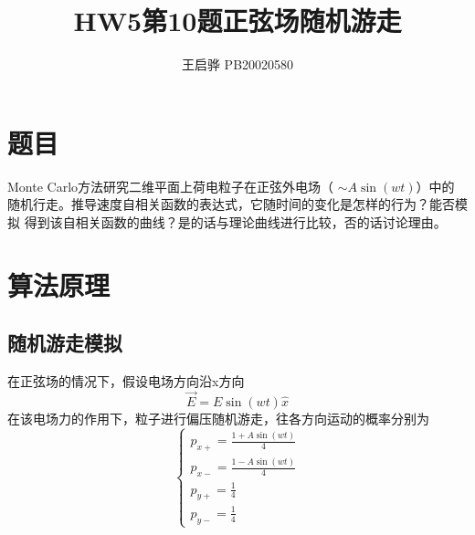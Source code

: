 \documentclass{article}
\title{\songti \zihao{2}\bfseries HW5第10题正弦场随机游走}
\author{王启骅 PB20020580}
\begin{document}
	\maketitle
	\section{题目}
Monte Carlo方法研究二维平面上荷电粒子在正弦外电场（  $\sim A\sin(wt) $）中的
随机行走。推导速度自相关函数的表达式，它随时间的变化是怎样的行为？能否模拟
得到该自相关函数的曲线？是的话与理论曲线进行比较，否的话讨论理由。
	
	\section{算法原理}
	\subsection{随机游走模拟}
	在正弦场的情况下，假设电场方向沿x方向
	\begin{equation}
		\vec{E}=E\sin(wt)\hat{x}
	\end{equation}
在该电场力的作用下，粒子进行偏压随机游走，往各方向运动的概率分别为
\begin{equation}
	\begin{cases}
		p_{x+}=\frac{1+A\sin(wt)}{4}\\
		p_{x-}=\frac{1-A\sin(wt)}{4}\\
		p_{y+}=\frac{1}{4}\\
		p_{y-}=\frac{1}{4}
	\end{cases}
\end{equation}
\end{document}
